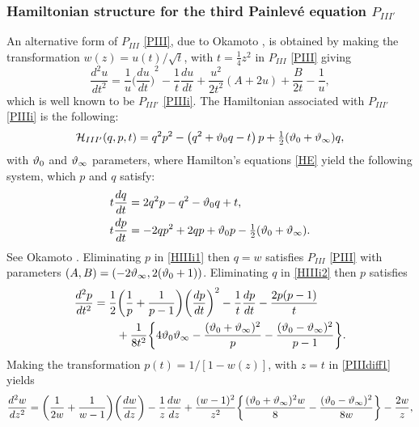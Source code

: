 \documentclass[12pt]{article}
\def\P{Painlev\'e }
\numberwithin{figure}{section}
\numberwithin{equation}{section}
\numberwithin{table}{section}
\begin{document}
\subsubsection{Hamiltonian structure for the third \P equation $P_{III'}$}
An alternative form of $P_{III}$ \eqref{PIII}, due to Okamoto \cite{P:56:264,P:56:367,P:30:305}, is obtained by making the transformation $w(z)=u(t)/\sqrt t$, with $t=\tfrac{1}{4}z^2$ in $P_{III}$ \eqref{PIII} giving
\begin{equation}
\frac{d^2u}{dt^2}=\frac{1}{u}{\bigg(\frac{du}{dt}\bigg)\!}^2-\frac{1}{t}\frac{du}{dt}+\frac{u^2}{2t^2}(A+2u)+\frac{B}{2t}-\frac{1}{u},\label{PIIIi}
\end{equation}
which is well known to be $P_{III'}$ \eqref{PIIIi}.
The Hamiltonian associated with $P_{III'}$ \eqref{PIIIi} is the following:
\begin{equation}
\mathcal{H}_{III'}(q,p,t) = q^2p^2 -\left(q^2+\vartheta_0q-t\right)p +\tfrac12(\vartheta_0+\vartheta_{\infty})q,\label{HIIIi}
\end{equation} with $\vartheta_0$ and $\vartheta_{\infty}$ parameters,
where Hamilton's equations \eqref{HE} yield the following system, which $p$ and $q$ satisfy:
\begin{subequations}\label{HIIIiSYS}
\begin{align}
t\frac{dq}{dt}&=2q^2p-q^2-\vartheta_0q+t,\label{HIIIi1}\\\label{HIIIi2}
t\frac{dp}{dt}&=-2qp^2+2qp+\vartheta_0p-\tfrac12(\vartheta_0+\vartheta_{\infty}).
\end{align}
\end{subequations}
See Okamoto \cite{P:56:264,P:56:367,P:30:305}.
Eliminating $p$ in \eqref{HIIIi1} then $q=w$ satisfies $P_{III}$ \eqref{PIII} with parameters  $(A,B)=(-2\vartheta_{\infty},2(\vartheta_0+1))$.
Eliminating $q$ in \eqref{HIIIi2} then $p$ satisfies
\begin{align}\nonumber
\frac{d^2p}{dt^2}&=\frac{1}{2}\bigg(\frac{1}{p}+\frac{1}{p-1}\bigg)\bigg(\frac{dp}{dt}\bigg)^2-\frac{1}{t}\frac{dp}{dt}-\frac{2p(p-1)}{t}\\
&\qquad+\frac{1}{8t^2}\bigg\{4\vartheta_0\vartheta_\infty-\frac{(\vartheta_0+\vartheta_\infty)^2}{p}-\frac{(\vartheta_0-\vartheta_\infty)^2}{p-1}\bigg\}.\label{PIIIdiff1}
\end{align}
Making the transformation $p(t)=1/[1-w(z)]$, with $z=t$ in \eqref{PIIIdiff1} yields
\begin{equation}\nonumber
\frac{d^2w}{dz^2}=\bigg(\frac{1}{2w}+\frac{1}{w-1}\bigg)\bigg(\frac{dw}{dz}\bigg)-\frac{1}{z}\frac{dw}{dz}+\frac{(w-1)^2}{z^2}\bigg\{\frac{(\vartheta_0+\vartheta_\infty)^2w}{8}
-\frac{(\vartheta_0-\vartheta_\infty)^2}{8w}\bigg\}-\frac{2w}{z},
\end{equation}
\end{document}
